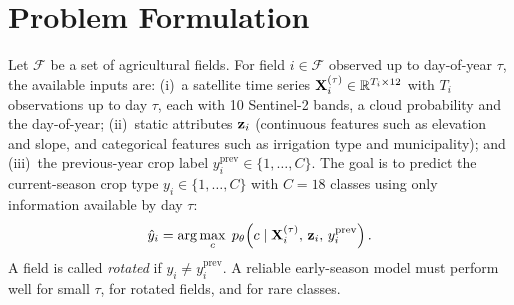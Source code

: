 \section{Problem Formulation}
\label{sec:problem}
Let $\mathcal{F}$ be a set of agricultural fields. For field $i\in\mathcal{F}$ observed up to day-of-year $\tau$, the available inputs are:
(i)~a satellite time series $\mathbf{X}_i^{(\tau)}\in\mathbb{R}^{T_i\times 12}$ with $T_i$ observations up to day $\tau$, each with 10 Sentinel-2 bands, a cloud probability and the day-of-year;
(ii)~static attributes $\mathbf{z}_i$ (continuous features such as elevation and slope, and categorical features such as irrigation type and municipality); and
(iii)~the previous-year crop label $y_i^{\mathrm{prev}}\in\{1,\dots,C\}$.
The goal is to predict the current-season crop type $y_i\in\{1,\dots,C\}$ with $C=18$ classes using only information available by day $\tau$:
\begin{equation}
\hat{y}_i = \arg\max_{c}\; p_\theta\!\left(c \mid \mathbf{X}_i^{(\tau)},\, \mathbf{z}_i,\, y_i^{\mathrm{prev}}\right).
\label{eq:problem}
\end{equation}
A field is called \emph{rotated} if $y_i \neq y_i^{\mathrm{prev}}$.  A reliable early-season model must perform well for small $\tau$, for rotated fields, and for rare classes.

